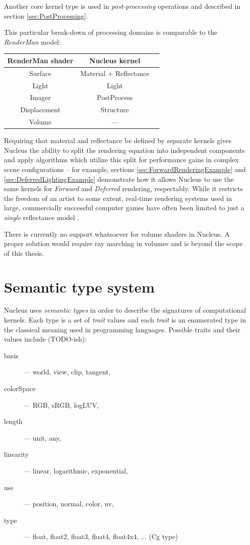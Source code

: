 Another core kernel type is used in \emph{post-processing} operations and described in section \ref{sec:PostProcessing}.

This particular break-down of processing domains is comparable to the \emph{RenderMan} model:

\begin{center}
\begin{tabular}{ | c | c | c | }
\hline
RenderMan shader & Nucleus kernel \\
\hline
Surface & Material + Reflectance \\
Light & Light \\
Imager & PostProcess \\
Displacement & Structure \\
Volume & --- \\
\hline
\end{tabular}
\end{center}

Requiring that material and reflectance be defined by separate kernels gives Nucleus the ability to split the rendering equation into independent components and apply algorithms which utilize this split for performance gains in complex scene configurations -- for example, sections \ref{sec:ForwardRenderingExample} and \ref{sec:DeferredLightingExample} demonstrate how it allows Nucleus to use the same kernels for \emph{Forward} and \emph{Deferred} rendering, respectably. While it restricts the freedom of an artist to some extent, real-time rendering systems used in large, commercially successful computer games have often been limited to just a \emph{single} reflectance model \cite{CryEngine3Deferred, Killzone2Deferred}.

There is currently no support whatsoever for volume shaders in Nucleus. A proper solution would require ray marching in volumes and is beyond the scope of this thesis.

\section{Semantic type system}

Nucleus uses \emph{semantic types} in order to describe the signatures of computational kernels. Each type is a set of \emph{trait} values and each \emph{trait} is an enumerated type in the classical meaning used in programming languages. Possible traits and their values include (TODO-ish):
\begin{description}
\item[basis] --- world, view, clip, tangent,
\item[colorSpace] --- RGB, sRGB, logLUV,
\item[length] --- unit, any,
\item[linearity] --- linear, logarithmic, exponential,
\item[use] --- position, normal, color, uv,
\item[type] --- float, float2, float3, float4, float4x4, ... (Cg type)
\end{description}

